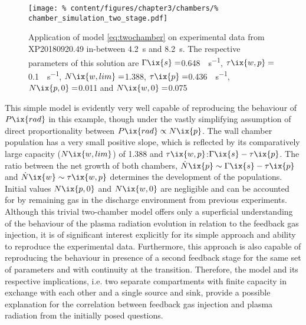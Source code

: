 %
        \begin{figure}[t]%
            \centering%
            \texttt{[image: \%
                content/figures/chapter3/chambers/\%
                chamber\_simulation\_two\_stage.pdf]}%
            \caption{Application of model \cref{eq:twochamber} on experimental data from XP20180920.49 in-between \SI{4.2}{\second} and \SI{8.2}{\second}. The respective parameters of this solution are $\Gamma\ix{s}=$\SI{0.648}{\arbitraryunit\per\second}, $\tau\ix{w,p}=$\SI{0.1}{\arbitraryunit\per\second}, $N\ix{w,lim}=$\SI{1.388}{\arbitraryunit}, $\tau\ix{p}=$\SI{0.436}{\arbitraryunit\per\second}, $N\ix{p,0}=$\SI{0.011}{\arbitraryunit} and $N\ix{w,0}=$\SI{0.075}{\arbitraryunit}}\label{fig:twochamber_twostage}%
        \end{figure}%
%
        This simple model is evidently very well capable of reproducing the behaviour of $P\ix{rad}$ in this example, though under the vastly simplifying assumption of direct proportionality between $P\ix{rad}\propto N\ix{p}$. The wall chamber population has a very small positive slope, which is reflected by its comparatively large capacity ($N\ix{w,lim}$) of 1.388 and $\tau\ix{w,p}$:$\Gamma\ix{s}-\tau\ix{p}$. The ratio between the net growth of both chambers, $\dot{N}\ix{p}\sim\Gamma\ix{s}-\tau\ix{p}$ and $\dot{N}\ix{w}\sim\tau\ix{w,p}$ determines the development of the populations. Initial values $N\ix{p,0}$ and $N\ix{w,0}$ are negligible and can be accounted for by remaining gas in the discharge environment from previous experiments.\\%
        Although this trivial two-chamber model offers only a superficial understanding of the behaviour of the plasma radiation evolution in relation to the feedback gas injection, it is of significant interest explicitly for its simple approach and ability to reproduce the experimental data. Furthermore, this approach is also capable of reproducing the behaviour in presence of a second feedback stage for the same set of parameters and with continuity at the transition. Therefore, the model and its respective implications, i.e. two separate compartments with finite capacity in exchange with each other and a single source and sink, provide a possible explanation for the correlation between feedback gas injection and plasma radiation from the initially posed questions.%
%
